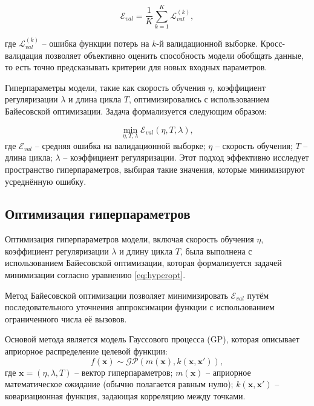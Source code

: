 \begin{equation}
\mathcal{E}_{val} = \frac{1}{K} \sum_{k=1}^K \mathcal{L}_{val}^{(k)},
\end{equation}

где $\mathcal{L}_{val}^{(k)}$ -- ошибка функции потерь на $k$-й валидационной выборке.
Кросс-валидация позволяет объективно оценить способность модели обобщать
данные, то есть точно предсказывать критерии для новых входных параметров.

Гиперпараметры модели, такие как скорость обучения $\eta$, коэффициент
регуляризации $\lambda$ и длина цикла $T$, оптимизировались с использованием
Байесовской оптимизации. Задача формализуется следующим образом:

\begin{equation}
    \label{eq:hyperopt}
\min_{\eta, T, \lambda} \mathcal{E}_{val}(\eta, T, \lambda),
\end{equation}
где $\mathcal{E}_{val}$ -- средняя ошибка на валидационной выборке;
$\eta$ -- скорость обучения; $T$ -- длина цикла; $\lambda$ -- коэффициент
регуляризации. Этот подход эффективно исследует пространство гиперпараметров,
выбирая такие значения, которые минимизируют усреднённую ошибку.




\subsection{Оптимизация гиперпараметров}\label{sec:ch4/sec4/subsec3}

Оптимизация гиперпараметров модели, включая скорость обучения $\eta$, коэффициент регуляризации
$\lambda$ и длину цикла $T$, была выполнена с использованием Байесовской
оптимизации, которая формализуется задачей минимизации согласно уравнению \ref{eq:hyperopt}.

Метод Байесовской оптимизации позволяет минимизировать $\mathcal{E}_{val}$ путём последовательного
уточнения аппроксимации функции с использованием ограниченного числа её вызовов.

Основой метода является модель Гауссового процесса (GP),
которая описывает априорное распределение целевой функции:
\begin{equation}
f(\mathbf{x}) \sim \mathcal{GP}(m(\mathbf{x}), k(\mathbf{x}, \mathbf{x}')),
\end{equation}
где $\mathbf{x} = (\eta, \lambda, T)$ -- вектор гиперпараметров;
$m(\mathbf{x})$ -- априорное математическое ожидание (обычно полагается равным нулю);
$k(\mathbf{x}, \mathbf{x}')$ -- ковариационная функция, задающая корреляцию между точками.

